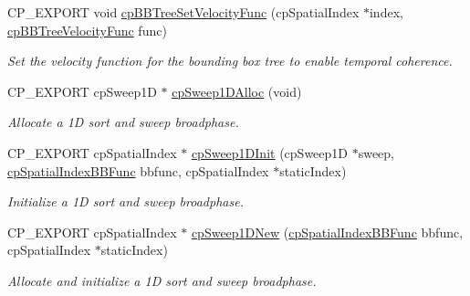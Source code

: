 \begin{DoxyCompactItemize}
\mbox{\label{group__cp_spatial_index_ga5be19704958930441d558dfaeb2e83d5}} 
C\+P\+\_\+\+E\+X\+P\+O\+RT void \mbox{\hyperlink{group__cp_spatial_index_ga5be19704958930441d558dfaeb2e83d5}{cp\+B\+B\+Tree\+Set\+Velocity\+Func}} (cp\+Spatial\+Index $\ast$index, \mbox{\hyperlink{group__cp_spatial_index_ga5e805ddbe3cab9b92a6fbd933ff6e6b0}{cp\+B\+B\+Tree\+Velocity\+Func}} func)
\begin{DoxyCompactList}\small\item\em Set the velocity function for the bounding box tree to enable temporal coherence. \end{DoxyCompactList}\item 
\mbox{\label{group__cp_spatial_index_gada77f0bd84294d6ab654d39597a5cc2e}} 
C\+P\+\_\+\+E\+X\+P\+O\+RT cp\+Sweep1D $\ast$ \mbox{\hyperlink{group__cp_spatial_index_gada77f0bd84294d6ab654d39597a5cc2e}{cp\+Sweep1\+D\+Alloc}} (void)
\begin{DoxyCompactList}\small\item\em Allocate a 1D sort and sweep broadphase. \end{DoxyCompactList}\item 
\mbox{\label{group__cp_spatial_index_ga595f1c8880863a897ebab17f725a7259}} 
C\+P\+\_\+\+E\+X\+P\+O\+RT cp\+Spatial\+Index $\ast$ \mbox{\hyperlink{group__cp_spatial_index_ga595f1c8880863a897ebab17f725a7259}{cp\+Sweep1\+D\+Init}} (cp\+Sweep1D $\ast$sweep, \mbox{\hyperlink{group__cp_spatial_index_gaa8cf991cadcee1fbb6ee9379a0a6e0ea}{cp\+Spatial\+Index\+B\+B\+Func}} bbfunc, cp\+Spatial\+Index $\ast$static\+Index)
\begin{DoxyCompactList}\small\item\em Initialize a 1D sort and sweep broadphase. \end{DoxyCompactList}\item 
\mbox{\label{group__cp_spatial_index_gaf4552114a532071f64ab4a182cca8c1f}} 
C\+P\+\_\+\+E\+X\+P\+O\+RT cp\+Spatial\+Index $\ast$ \mbox{\hyperlink{group__cp_spatial_index_gaf4552114a532071f64ab4a182cca8c1f}{cp\+Sweep1\+D\+New}} (\mbox{\hyperlink{group__cp_spatial_index_gaa8cf991cadcee1fbb6ee9379a0a6e0ea}{cp\+Spatial\+Index\+B\+B\+Func}} bbfunc, cp\+Spatial\+Index $\ast$static\+Index)
\begin{DoxyCompactList}\small\item\em Allocate and initialize a 1D sort and sweep broadphase. \end{DoxyCompactList}\item 

\end{DoxyCompactItemize}

